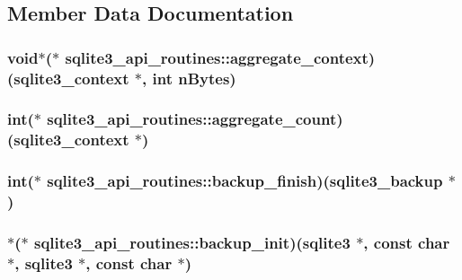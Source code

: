 \subsection{Member Data Documentation}
\hypertarget{structsqlite3__api__routines_a4af9ccf21e07862a8c3636c16d3acd19}{
\subsubsection[{aggregate\-\_\-context}]{\setlength{\rightskip}{0pt plus 5cm}void$\ast$($\ast$ sqlite3\-\_\-api\-\_\-routines\-::aggregate\-\_\-context)({\bf sqlite3\-\_\-context} $\ast$, int n\-Bytes)}}\label{structsqlite3__api__routines_a4af9ccf21e07862a8c3636c16d3acd19}
\hypertarget{structsqlite3__api__routines_a8373f7a5dd2d6f1c86bbf024b1796156}{
\subsubsection[{aggregate\-\_\-count}]{\setlength{\rightskip}{0pt plus 5cm}int($\ast$ sqlite3\-\_\-api\-\_\-routines\-::aggregate\-\_\-count)({\bf sqlite3\-\_\-context} $\ast$)}}\label{structsqlite3__api__routines_a8373f7a5dd2d6f1c86bbf024b1796156}
\hypertarget{structsqlite3__api__routines_abb9900ba9f5faed0031817665594eeec}{
\subsubsection[{backup\-\_\-finish}]{\setlength{\rightskip}{0pt plus 5cm}int($\ast$ sqlite3\-\_\-api\-\_\-routines\-::backup\-\_\-finish)({\bf sqlite3\-\_\-backup} $\ast$)}}\label{structsqlite3__api__routines_abb9900ba9f5faed0031817665594eeec}
\hypertarget{structsqlite3__api__routines_acde910f4e49914357c4939f434bca34b}{
\subsubsection[{backup\-\_\-init}]{$\ast$($\ast$ sqlite3\-\_\-api\-\_\-routines\-::backup\-\_\-init)({\bf sqlite3} $\ast$, const char $\ast$, {\bf sqlite3} $\ast$, const char $\ast$)}}\label{structsqlite3__api__routines_acde910f4e49914357c4939f434bca34b}
